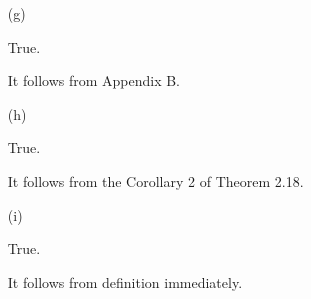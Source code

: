 \begin{Exercise}
\begin{enumerate}[(a)]
\item[(g)]
\begin{answer}
True.
\end{answer}
\begin{solution}
It follows from Appendix B.
\end{solution}

\item[(h)]
\begin{answer}
True.
\end{answer}
\begin{solution}
It follows from the Corollary 2 of Theorem 2.18.
\end{solution}

\item[(i)]
\begin{answer}
True.
\end{answer}
\begin{solution}
It follows from definition immediately.
\end{solution}

\end{enumerate}
\end{Exercise}
